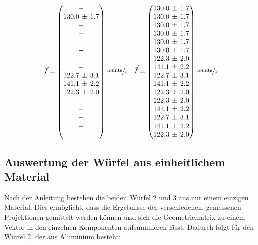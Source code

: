 \begin{equation}
	\vec{I}=
	\begin{pmatrix}
		- \\
		130.0\,\pm\,1.7 \\
		- \\
		- \\
	  - \\
		- \\
		- \\
		- \\
		122.7\,\pm\,3.1 \\
		141.1\,\pm\,2.2 \\
		122.3\,\pm\,2.0 \\
		- \\
    - \\
    - \\
    - \\
    -
	\end{pmatrix}
	\sfrac{\text{counts}}{\text{s}}\quad
	\vec{\tilde{I}}=
	\begin{pmatrix}
		130.0\,\pm\,1.7 \\
		130.0\,\pm\,1.7 \\
		130.0\,\pm\,1.7 \\
		130.0\,\pm\,1.7 \\
		130.0\,\pm\,1.7 \\
		130.0\,\pm\,1.7 \\
		122.3\,\pm\,2.0 \\
		141.1\,\pm\,2.2 \\
		122.7\,\pm\,3.1 \\
		141.1\,\pm\,2.2 \\
		122.3\,\pm\,2.0 \\
		122.3\,\pm\,2.0 \\
    141.1\,\pm\,2.2 \\
    122.7\,\pm\,3.1 \\
    141.1\,\pm\,2.2 \\
    122.3\,\pm\,2.0 \\
	\end{pmatrix}
    \sfrac{\text{counts}}{\text{s}}
	\label{eq:int}
\end{equation}

\subsection{Auswertung der Würfel aus einheitlichem Material}

Nach der Anleitung bestehen die beiden Würfel 2 und 3 aus nur einem einzigen Material. Dies ermöglicht, dass die Ergebnisse der verschiedenen, gemessenen Projektionen gemittelt werden können und sich die Geometriematrix zu einem Vektor in den einzelnen Komponenten aufsummieren lässt.
Dadurch folgt für den Würfel 2, der aus Aluminium besteht:

